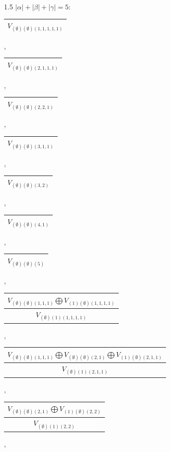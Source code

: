 \documentclass[letterpaper,11pt]{article}
\begin{document}
	\begin{spacing}{1.5}
		$|\alpha| + |\beta| + |\gamma|=5$:
	\end{spacing}

	\begin{tabular}{| c |}
		\hline
		$V_{(\emptyset)(\emptyset)(1,1,1,1,1)}$\\
		\hline
	\end{tabular}, 
	\begin{tabular}{| c |}
		\hline
		$V_{(\emptyset)(\emptyset)(2,1,1,1)}$\\
		\hline
	\end{tabular}, 
	\begin{tabular}{| c |}
		\hline
		$V_{(\emptyset)(\emptyset)(2,2,1)}$\\
		\hline
	\end{tabular}, 
	\begin{tabular}{| c |}
		\hline
		$V_{(\emptyset)(\emptyset)(3,1,1)}$\\
		\hline
	\end{tabular}, 
	\begin{tabular}{| c |}
		\hline
		$V_{(\emptyset)(\emptyset)(3,2)}$\\
		\hline
	\end{tabular}, 
	\begin{tabular}{| c |}
		\hline
		$V_{(\emptyset)(\emptyset)(4,1)}$\\
		\hline
	\end{tabular}, 
	\begin{tabular}{| c |}
		\hline
		$V_{(\emptyset)(\emptyset)(5)}$\\
		\hline
	\end{tabular}, 
	\begin{tabular}{| c |}
		\hline
		$V_{(\emptyset)(\emptyset)(1,1,1)}$$\bigoplus$$V_{(1)(\emptyset)(1,1,1,1)}$\\
		\hline
		$V_{(\emptyset)(1)(1,1,1,1)}$\\
		\hline
	\end{tabular}, 
	\begin{tabular}{| c |}
		\hline
		$V_{(\emptyset)(\emptyset)(1,1,1)}$$\bigoplus$$V_{(\emptyset)(\emptyset)(2,1)}$$\bigoplus$$V_{(1)(\emptyset)(2,1,1)}$\\
		\hline
		$V_{(\emptyset)(1)(2,1,1)}$\\
		\hline
	\end{tabular}, 
	\newline
	\begin{tabular}{| c |}
		\hline
		$V_{(\emptyset)(\emptyset)(2,1)}$$\bigoplus$$V_{(1)(\emptyset)(2,2)}$\\
		\hline
		$V_{(\emptyset)(1)(2,2)}$\\
		\hline
	\end{tabular}, 
\end{document}

